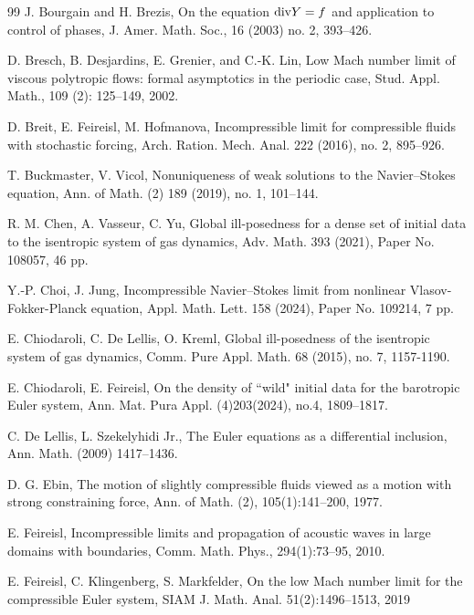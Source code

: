 \documentclass[12pt,reqno]{amsart}
\theoremstyle{definition}
\theoremstyle{remark}
\numberwithin{equation}{section}
\newcommand{\Dv}{{\rm div}}
\begin{document}
\bigskip\bigskip
\begin{thebibliography}{99}
J. Bourgain and H. Brezis, On the equation $\Dv Y = f$ and application to control of phases,  J. Amer. Math. Soc., 16 (2003) no. 2, 393--426.

 D. Bresch, B. Desjardins, E. Grenier, and C.-K. Lin, Low Mach number limit of viscous polytropic flows: formal
asymptotics in the periodic case, Stud. Appl. Math., 109 (2): 125--149, 2002.


D. Breit, E. Feireisl, M. Hofmanova, Incompressible limit for compressible fluids with stochastic forcing,
Arch. Ration. Mech. Anal. 222 (2016), no. 2, 895--926.

 T. Buckmaster, V. Vicol, Nonuniqueness of weak solutions to the Navier--Stokes equation, Ann. of Math. (2) 189 (2019), no. 1, 101--144.

 R. M. Chen, A. Vasseur,  C. Yu,   Global ill-posedness for a dense set of initial data to the isentropic system of gas dynamics, Adv. Math. 393 (2021), Paper No. 108057, 46 pp.

 Y.-P. Choi, J. Jung, Incompressible Navier--Stokes limit from nonlinear Vlasov-Fokker-Planck equation, Appl. Math. Lett. 158 (2024), Paper No. 109214, 7 pp.


 E. Chiodaroli, C. De Lellis, O. Kreml,
Global ill-posedness of the isentropic system of gas dynamics, Comm. Pure Appl. Math. 68 (2015), no. 7, 1157-1190.



 E. Chiodaroli, E. Feireisl,
On the density of ``wild" initial data for the barotropic Euler system, Ann. Mat. Pura Appl. (4)203(2024), no.4, 1809--1817.

C. De Lellis, L. Szekelyhidi Jr., The Euler equations as a differential inclusion, Ann. Math. (2009) 1417--1436.


 D. G. Ebin, The motion of slightly compressible fluids viewed as a motion with strong constraining force, Ann. of Math. (2), 105(1):141--200, 1977.



E. Feireisl, Incompressible limits and propagation of acoustic waves in large domains with boundaries, Comm. Math. Phys., 294(1):73--95, 2010.

E. Feireisl, C. Klingenberg, S. Markfelder, On the low Mach number limit for the compressible Euler
system, SIAM J. Math. Anal. 51(2):1496–1513, 2019


\end{thebibliography}
\end{document}
